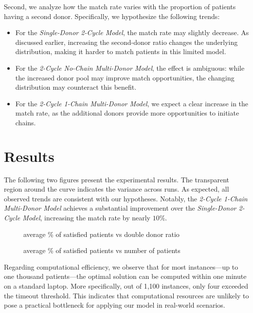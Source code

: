 Second, we analyze how the match rate varies with the proportion of patients having a second donor. Specifically, we hypothesize the following trends:
\begin{itemize}
\item For the \textit{Single-Donor 2-Cycle Model}, the match rate may slightly decrease. As discussed earlier, increasing the second-donor ratio changes the underlying distribution, making it harder to match patients in this limited model.
\item For the \textit{2-Cycle No-Chain Multi-Donor Model}, the effect is ambiguous: while the increased donor pool may improve match opportunities, the changing distribution may counteract this benefit.
\item For the \textit{2-Cycle 1-Chain Multi-Donor Model}, we expect a clear increase in the match rate, as the additional donors provide more opportunities to initiate chains.
\end{itemize}



\section{Results}


The following two figures present the experimental results. The transparent region around the curve indicates the variance across runs. As expected, all observed trends are consistent with our hypotheses. Notably, the \textit{2-Cycle 1-Chain Multi-Donor Model} achieves a substantial improvement over the \textit{Single-Donor 2-Cycle Model}, increasing the match rate by nearly $10\%$.

\begin{figure}[H]
    \centering
    
    \caption[average \% of satisfied patients vs double donor ratio]{average \% of satisfied patients vs double donor ratio}
    \label{fig:test}
\end{figure}

\begin{figure}[H]
    \centering
    
    \caption[average \% of satisfied patients vs double donor ratio]{average \% of satisfied patients vs number of patients}
    \label{fig:test2}
\end{figure}

Regarding computational efficiency, we observe that for most instances—up to one thousand patients—the optimal solution can be computed within one minute on a standard laptop. More specifically, out of 1,100 instances, only four exceeded the timeout threshold. This indicates that computational resources are unlikely to pose a practical bottleneck for applying our model in real-world scenarios.


